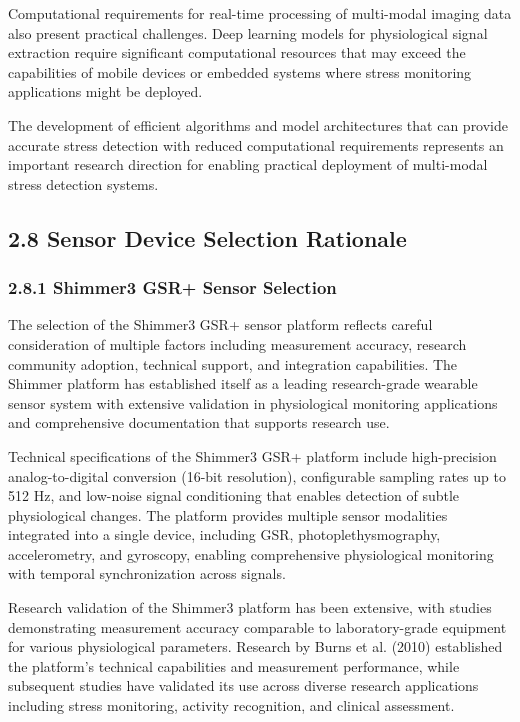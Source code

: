 \documentclass[12pt,a4paper]{article}
\begin{document}
Computational requirements for real-time processing of multi-modal imaging data also present practical challenges. Deep
learning models for physiological signal extraction require significant computational resources that may exceed the
capabilities of mobile devices or embedded systems where stress monitoring applications might be deployed.

The development of efficient algorithms and model architectures that can provide accurate stress detection with reduced
computational requirements represents an important research direction for enabling practical deployment of multi-modal
stress detection systems.

\subsection{2.8 Sensor Device Selection Rationale}

\subsubsection{2.8.1 Shimmer3 GSR+ Sensor Selection}

The selection of the Shimmer3 GSR+ sensor platform reflects careful consideration of multiple factors including
measurement accuracy, research community adoption, technical support, and integration capabilities. The Shimmer platform
has established itself as a leading research-grade wearable sensor system with extensive validation in physiological
monitoring applications and comprehensive documentation that supports research use.

Technical specifications of the Shimmer3 GSR+ platform include high-precision analog-to-digital conversion (16-bit
resolution), configurable sampling rates up to 512 Hz, and low-noise signal conditioning that enables detection of
subtle physiological changes. The platform provides multiple sensor modalities integrated into a single device,
including GSR, photoplethysmography, accelerometry, and gyroscopy, enabling comprehensive physiological monitoring with
temporal synchronization across signals.

Research validation of the Shimmer3 platform has been extensive, with studies demonstrating measurement accuracy
comparable to laboratory-grade equipment for various physiological parameters. Research by Burns et al. (2010)
established the platform's technical capabilities and measurement performance, while subsequent studies have validated
its use across diverse research applications including stress monitoring, activity recognition, and clinical assessment.
\end{document}
